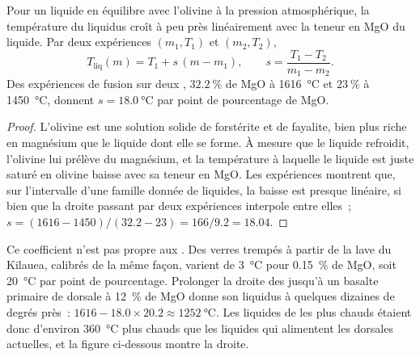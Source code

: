 \begin{proposition}\label{prop:b2:precambrian-earth:liquidus}
Pour un liquide en équilibre avec l'olivine à la pression atmosphérique, la température du liquidus
croît à peu près linéairement avec la teneur en MgO du liquide. Par deux expériences $(m_1, T_1)$ et
$(m_2, T_2)$,
\[
  T_{\text{liq}}(m) = T_1 + s\,(m - m_1), \qquad s = \frac{T_1 - T_2}{m_1 - m_2} .
\]
Des expériences de fusion sur deux , $\qty{32.2}{\percent}$ de MgO à \qty{1616}{\celsius} et
$\qty{23}{\percent}$ à \qty{1450}{\celsius}, donnent $s = \qty{18.0}{\celsius}$ par point de pourcentage de
MgO.
\end{proposition}

\begin{proof}
L'olivine est une solution solide de forstérite et de fayalite, bien plus riche en magnésium que le liquide
dont elle se forme. À mesure que le liquide refroidit, l'olivine lui prélève du magnésium, et la température à
laquelle le liquide est juste saturé en olivine baisse avec sa teneur en MgO. Les expériences montrent que, sur l'intervalle
d'une famille donnée de liquides, la baisse est presque linéaire, si bien que la droite passant par
deux expériences interpole entre elles~; $s = (1616 - 1450)/(32.2 - 23) = 166/9.2 = 18.04$.
\end{proof}

Ce coefficient n'est pas propre aux . Des verres trempés à partir de la lave du Kilauea,
calibrés de la même façon, varient de \qty{3}{\celsius} pour \qty{0.15}{\percent} de MgO, soit
\qty{20}{\celsius} par point de pourcentage. Prolonger la droite des  jusqu'à un basalte primaire de dorsale
à \qty{12}{\percent} de MgO donne son liquidus à quelques dizaines de degrés près~: $1616 -
18.0\times20.2 \approx \qty{1252}{\celsius}$. Les liquides de  les plus chauds étaient donc
d'environ \qty{360}{\celsius} plus chauds que les liquides qui alimentent les dorsales actuelles, et la figure ci-dessous
montre la droite.

